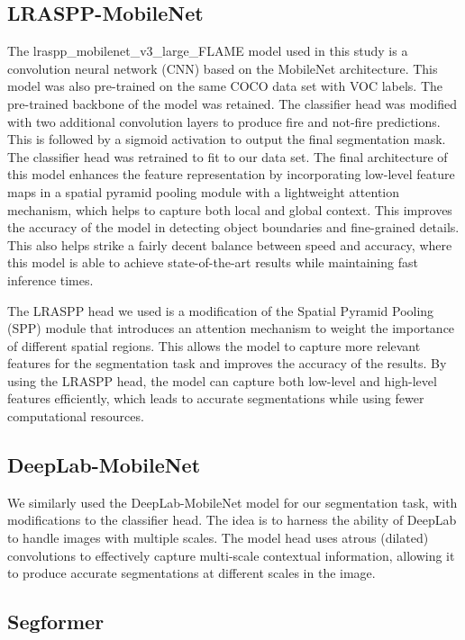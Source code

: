 \subsection{LRASPP-MobileNet}
The lraspp\_mobilenet\_v3\_large\_FLAME model \cite{howard2019searching} used in this study is a convolution neural network (CNN) based on the MobileNet architecture. This model was also pre-trained on the same COCO data set with VOC labels. The pre-trained backbone of the model was retained. The classifier head was modified with two additional convolution layers to produce fire and not-fire predictions. This is followed by a sigmoid activation to output the final segmentation mask. The classifier head was retrained to fit to our data set. The final architecture of this model enhances the feature representation by incorporating low-level feature maps in a spatial pyramid pooling module with a lightweight attention mechanism, which helps to capture both local and global context. This improves the accuracy of the model in detecting object boundaries and fine-grained details. This also helps strike a fairly decent balance between speed and accuracy, where this model is able to achieve state-of-the-art results while maintaining fast inference times.

The LRASPP \cite{howard2019searching} head we used is a modification of the Spatial Pyramid Pooling (SPP) module that introduces an attention mechanism to weight the importance of different spatial regions. This allows the model to capture more relevant features for the segmentation task and improves the accuracy of the results. By using the LRASPP head, the model can capture both low-level and high-level features efficiently, which leads to accurate segmentations while using fewer computational resources.

\subsection{DeepLab-MobileNet}

We similarly used the DeepLab-MobileNet \cite{chen_rethinking_2017} model for our segmentation task, with modifications to the classifier head. The idea is to harness the ability of DeepLab \cite{chen_rethinking_2017} to handle images with multiple scales. The model head uses atrous (dilated) convolutions to effectively capture multi-scale contextual information, allowing it to produce accurate segmentations at different scales in the image.

\subsection{Segformer}

